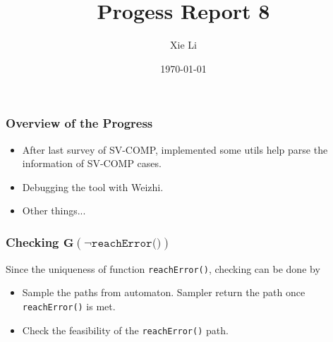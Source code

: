 \documentclass[11pt]{beamer}
\title{Progess Report 8}
\date{\today}
\author{Xie Li}
\begin{document}
\maketitle

\begin{frame}\frametitle{Overview of the Progress}
\begin{itemize}
\item After last survey of SV-COMP, implemented some utils help parse the information of SV-COMP cases.
\item Debugging the tool with Weizhi.
\item Other things...
\end{itemize}

\end{frame}


\begin{frame}\frametitle{Checking $\mathbf{G} (\neg \texttt{reachError()})$}

Since the uniqueness of function \texttt{reachError()}, checking can be done by

\begin{itemize}
\item Sample the paths from automaton. Sampler return the path once \texttt{reachError()} is met.

\item Check the feasibility of the \texttt{reachError()} path.
\end{itemize}
\end{frame}
\end{document}
